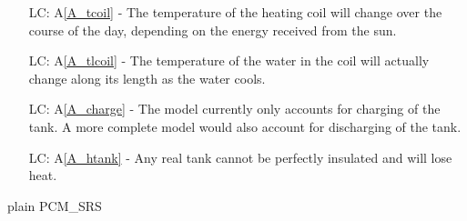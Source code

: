 \documentclass[12pt]{article}
\newcommand{\aref}[1]{A\ref{#1}}
\newcounter{lcnum} %
\begin{document}
\noindent \begin{itemize}


\item[LC\refstepcounter{lcnum}\thelcnum \label{LC_tcoil}:]\aref{A_tcoil} - The
  temperature of the heating coil will change over the course of the day,
  depending on the energy received from the sun.

\item[LC\refstepcounter{lcnum}\thelcnum \label{LC_tlcoil}:]\aref{A_tlcoil} - The
  temperature of the water in the coil will actually change along its length as
  the water cools.

\item[LC\refstepcounter{lcnum}\thelcnum \label{LC_charge}:]\aref{A_charge} - The
  model currently only accounts for charging of the tank.  A more complete model
  would also account for discharging of the tank.


\item[LC\refstepcounter{lcnum}\thelcnum \label{LC_htank}:]\aref{A_htank} - Any
  real tank cannot be perfectly insulated and will lose heat.

\end{itemize}

 {plain}
 {PCM_SRS}
\end{document}
